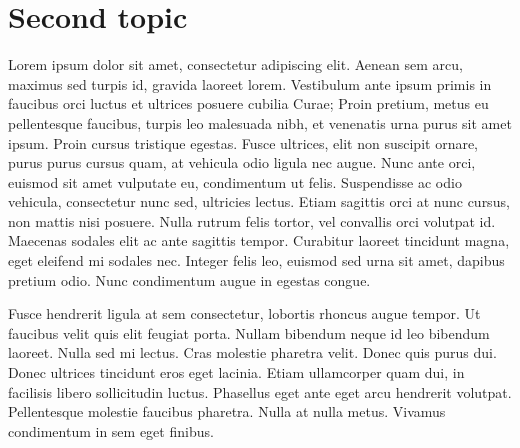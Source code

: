 \section{Second topic} 
Lorem ipsum dolor sit amet, consectetur adipiscing elit. Aenean sem arcu, maximus sed turpis id, gravida laoreet lorem. Vestibulum ante ipsum primis in faucibus orci luctus et ultrices posuere cubilia Curae; Proin pretium, metus eu pellentesque faucibus, turpis leo malesuada nibh, et venenatis urna purus sit amet ipsum. Proin cursus tristique egestas. Fusce ultrices, elit non suscipit ornare, purus purus cursus quam, at vehicula odio ligula nec augue. Nunc ante orci, euismod sit amet vulputate eu, condimentum ut felis. Suspendisse ac odio vehicula, consectetur nunc sed, ultricies lectus. Etiam sagittis orci at nunc cursus, non mattis nisi posuere. Nulla rutrum felis tortor, vel convallis orci volutpat id. Maecenas sodales elit ac ante sagittis tempor. Curabitur laoreet tincidunt magna, eget eleifend mi sodales nec. Integer felis leo, euismod sed urna sit amet, dapibus pretium odio. Nunc condimentum augue in egestas congue.

Fusce hendrerit ligula at sem consectetur, lobortis rhoncus augue tempor. Ut faucibus velit quis elit feugiat porta. Nullam bibendum neque id leo bibendum laoreet. Nulla sed mi lectus. Cras molestie pharetra velit. Donec quis purus dui. Donec ultrices tincidunt eros eget lacinia. Etiam ullamcorper quam dui, in facilisis libero sollicitudin luctus. Phasellus eget ante eget arcu hendrerit volutpat. Pellentesque molestie faucibus pharetra. Nulla at nulla metus. Vivamus condimentum in sem eget finibus.

